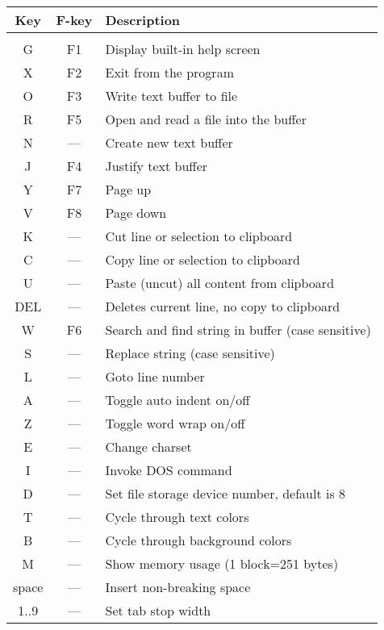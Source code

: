 \documentclass{article}
\begin{document}
    \begin{longtable}[l]{c c l}
        \textbf{Key} & \textbf{F-key} & \textbf{Description} \\
        \hline \\
        G    & F1    & Display built-in help screen \\
        X    & F2    & Exit from the program \\
        O    & F3    & Write text buffer to file \\
        R    & F5    & Open and read a file into the buffer \\
        N    & ---   & Create new text buffer \\
        J    & F4    & Justify text buffer \\
        Y    & F7    & Page up \\
        V    & F8    & Page down \\
        K    & ---   & Cut line or selection to clipboard \\
        C    & ---   & Copy line or selection to clipboard \\
        U    & ---   & Paste (uncut) all content from clipboard \\
        DEL  & ---   & Deletes current line, no copy to clipboard \\
        W    & F6    & Search and find string in buffer (case sensitive) \\
        S    & ---   & Replace string (case sensitive) \\
        L    & ---   & Goto line number \\
        A    & ---   & Toggle auto indent on/off \\
        Z    & ---   & Toggle word wrap on/off \\
        E    & ---   & Change charset\\
        I    & ---   & Invoke DOS command\\
        D    & ---   & Set file storage device number, default is 8 \\
        T    &  ---  & Cycle through text colors \\
        B    &  ---  & Cycle through background colors \\
        M    &  ---  & Show memory usage (1 block=251 bytes) \\
        space& ---   & Insert non-breaking space \\
        1..9 & ---   & Set tab stop width
    \end{longtable}
\end{document}
